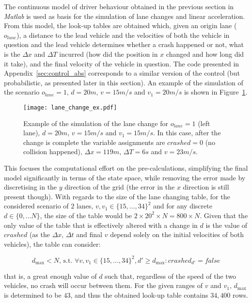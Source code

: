 The continuous model of driver behaviour obtained in the previous section in \textit{Matlab} is used as basis for the simulation of lane changes and linear acceleration. From this model, the look-up tables are obtained which, given an origin lane ($o_{lane}$), a distance to the lead vehicle and the velocities of both the vehicle in question and the lead vehicle determines whether a crash happened or not, what is the $\Delta x$ and $\Delta T$ incurred (how did the position in $x$ changed and how long did it take), and the final velocity of the vehicle in question. The code presented in Appendix~\ref{sec:control_abs} corresponds to a similar version of the control (but probabilistic, as presented later in this section). An example of the simulation of the scenario $o_{lane} = 1$, $d = 20m$, $v = 15m/s$ and $v_1 = 20m/s$ is shown in Figure~\ref{fig:lane_change_ex}.

\begin{figure}[h]
    \centering
    \texttt{[image: lane\_change\_ex.pdf]}
    \caption{Example of the simulation of the lane change for $o_{lane} = 1$ (left lane), $d = 20m$, $v = 15m/s$ and $v_1 = 15m/s$. In this case, after the change is complete the variable assignments are $crashed = 0$ (no collision happened), $\Delta x = 119m$, $\Delta T = 6s$ and $v = 23m/s$.}
    \label{fig:lane_change_ex}
\end{figure}

This focuses the computational effort on the pre-calculations, simplifying the final model significantly in terms of the state space, while removing the error made by discretising in the $y$ direction of the grid (the error in the $x$ direction is still present though). With regards to the size of the lane changing table, for the considered scenario of $2$ lanes, $v, v_1 \in \{15,...,34\}^2$ and for any discrete $d \in \{0,...N\}$, the size of the table would be $2\times 20^2 \times N = 800 \times N$. Given that the only value of the table that is effectively altered with a change in $d$ is the value of $crashed$ (as the $\Delta x$, $\Delta t$ and final $v$ depend solely on the initial velocities of both vehicles), the table can consider:

\begin{equation}
d_{\max} < N\text{, s.t. }\forall v, v_1 \in \{15,...,34\}^2, d' \geq d_{\max}: crashed_{d'} = false
\end{equation}

that is, a great enough value of $d$ such that, regardless of the speed of the two vehicles, no crash will occur between them. For the given ranges of $v$ and $v_1$, $d_{\max}$ is determined to be $43$, and thus the obtained look-up table contains $34,400$ rows.

